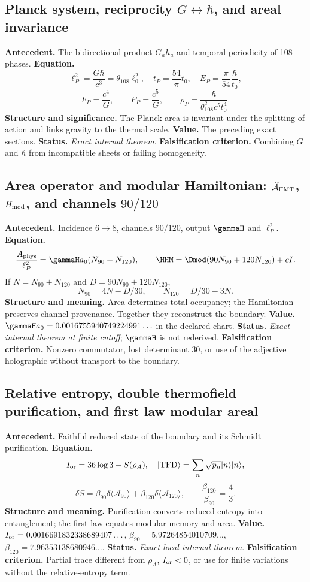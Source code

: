 \subsection*{Planck system, reciprocity \(G\leftrightarrow\hbar\), and areal invariance}
\textbf{Antecedent.} The bidirectional product \(G_a\hbar_a\) and temporal periodicity of 108 phases.
\textbf{Equation.}
\[
\ell_P^2=\frac{G\hbar}{c^3}=\theta_{108}\ell_0^2,
\quad t_P=\frac{54}{\pi}t_0,
\quad E_P=\frac{\pi}{54}\frac{\hbar}{t_0},
\]
\[
F_P=\frac{c^4}{G},\qquad P_P=\frac{c^5}{G},\qquad
\rho_P=\frac{\hbar}{\theta_{108}^2c^5t_0^4}.
\]
\textbf{Structure and significance.} The Planck area is invariant under the
splitting of action and links gravity to the thermal scale.
\textbf{Value.} The preceding exact sections.
\textbf{Status.} \emph{Exact internal theorem}. \textbf{Falsification criterion.} Combining
\(G\) and \(\hbar\) from incompatible sheets or failing homogeneity.

\subsection*{Area operator and modular Hamiltonian: \(\widehat{\mathcal A}_{\rm HMT}\), \(H_{\rm mod}\), and channels \(90/120\)}
\textbf{Antecedent.} Incidence \(6\to8\), channels \(90/120\), output
\(\gammaH\) and \(\ell_P^2\). \textbf{Equation.}
\[
\frac{A_{\rm phys}}{\ell_P^2}=\gammaH a_0(N_{90}+N_{120}),
\qquad
\HHM=\Dmod(90N_{90}+120N_{120})+cI.
\]
If \(N=N_{90}+N_{120}\) and
\(D=90N_{90}+120N_{120}\),
\[
N_{90}=4N-D/30,\qquad N_{120}=D/30-3N.
\]
\textbf{Structure and meaning.} Area determines total occupancy; the
Hamiltonian preserves channel provenance. Together they reconstruct the boundary.
\textbf{Value.} \(\gammaH a_0=0.0016755940749224991\ldots\) in the declared
chart. \textbf{Status.} \emph{Exact internal theorem at finite cutoff}; \(\gammaH\) is not
rederived. \textbf{Falsification criterion.} Nonzero commutator, lost determinant
\(30\), or use of the adjective holographic without transport to the boundary.

\subsection*{Relative entropy, double thermofield purification, and first law modular areal}
\textbf{Antecedent.} Faithful reduced state of the boundary and its Schmidt purification. \textbf{Equation.}
\[
I_{\rm or}=36\log3-S(\rho_A),
\quad
|\mathrm{TFD}\rangle=\sum_n\sqrt{p_n}|n\rangle|n\rangle,
\]
\[
\delta S=\beta_{90}\delta\langle \mathcal A_{90}\rangle
+\beta_{120}\delta\langle \mathcal A_{120}\rangle,
\qquad \frac{\beta_{120}}{\beta_{90}}=\frac43.
\]
\textbf{Structure and meaning.} Purification converts reduced entropy
into entanglement; the first law equates modular memory and area.
\textbf{Value.} \(I_{\rm or}=0.0016691832338689407\ldots\),
\(\beta_{90}=5.97264854010709\ldots\),
\(\beta_{120}=7.96353138680946\ldots\).
\textbf{Status.} \emph{Exact local internal theorem}. \textbf{Falsification criterion.} Partial
trace different from \(\rho_A\), \(I_{\rm or}<0\), or use for finite
variations without the relative-entropy term.

